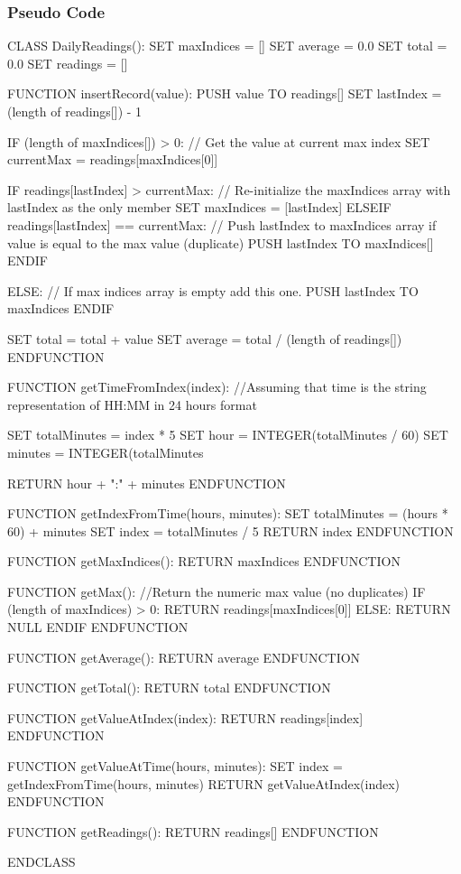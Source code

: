 \documentclass[12pt]{article}
\begin{document}
\subsubsection{Pseudo Code}
\begin{algorithm}[caption={Blueprint of dailyReadings ADT}, label=subalgo3]
CLASS DailyReadings():
	SET maxIndices = []  
	SET average = 0.0
	SET total = 0.0
	SET readings = []

	FUNCTION insertRecord(value):
		PUSH value TO readings[]
		SET lastIndex = (length of readings[]) - 1

		IF (length of maxIndices[]) > 0:
			// Get the value at current max index
			SET currentMax = readings[maxIndices[0]]
			
			IF readings[lastIndex] > currentMax:
				// Re-initialize the maxIndices array with lastIndex as the only member
				SET maxIndices = [lastIndex]
			ELSEIF readings[lastIndex] == currentMax:
				// Push lastIndex to maxIndices array if value is equal to the max value (duplicate)
				PUSH lastIndex TO maxIndices[]
			ENDIF

		ELSE:
			// If max indices array is empty add this one.
			PUSH lastIndex TO maxIndices
		ENDIF

		SET total = total + value
		SET average = total / (length of readings[])
	ENDFUNCTION

	FUNCTION getTimeFromIndex(index):
		//Assuming that time is the string representation of HH:MM in 24 hours format

		SET totalMinutes = index * 5
		SET hour = INTEGER(totalMinutes / 60)
		SET minutes = INTEGER(totalMinutes %

		RETURN hour + ":" + minutes
	ENDFUNCTION

	FUNCTION getIndexFromTime(hours, minutes):
		SET totalMinutes = (hours * 60) + minutes
		SET index = totalMinutes / 5
		RETURN index
	ENDFUNCTION

	FUNCTION getMaxIndices():
		RETURN maxIndices
	ENDFUNCTION

	FUNCTION getMax():
		//Return the numeric max value (no duplicates)
		IF (length of maxIndices) > 0:
			RETURN readings[maxIndices[0]]
		ELSE:
			RETURN NULL
		ENDIF
	ENDFUNCTION

	FUNCTION getAverage():
		RETURN average
	ENDFUNCTION

	FUNCTION getTotal():
		RETURN total
	ENDFUNCTION

	FUNCTION getValueAtIndex(index):
		RETURN readings[index]
	ENDFUNCTION

	FUNCTION getValueAtTime(hours, minutes):
		SET index = getIndexFromTime(hours, minutes)
		RETURN getValueAtIndex(index)
	ENDFUNCTION

	FUNCTION getReadings():
		RETURN readings[]
	ENDFUNCTION

ENDCLASS
\end{algorithm}
\end{document}
